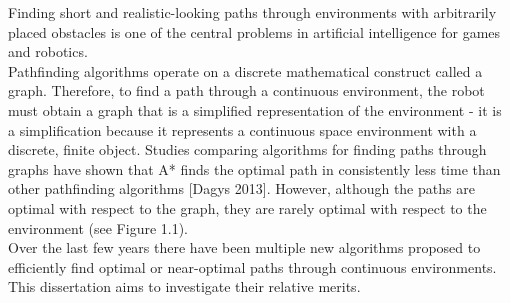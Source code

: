 \documentclass[12pt,twoside,notitlepage]{report}
\begin{document}
Finding short and realistic-looking paths through environments with arbitrarily placed obstacles is one of the central problems in artificial intelligence for games and robotics.\\

\noindent
Pathfinding algorithms operate on a discrete mathematical construct called a graph. Therefore, to find a path through a continuous environment, the robot must obtain a graph that is a simplified representation of the environment - it is a simplification because it represents a continuous space environment with a discrete, finite object. Studies comparing algorithms for finding paths through graphs have shown that A* finds the optimal path in consistently less time than other pathfinding algorithms [Dagys 2013]. However, although the paths are optimal with respect to the graph, they are rarely optimal with respect to the environment (see Figure 1.1).\\

\noindent
Over the last few years there have been multiple new algorithms proposed to efficiently find optimal or near-optimal paths through continuous environments. This dissertation aims to investigate their relative merits.
\end{document}
